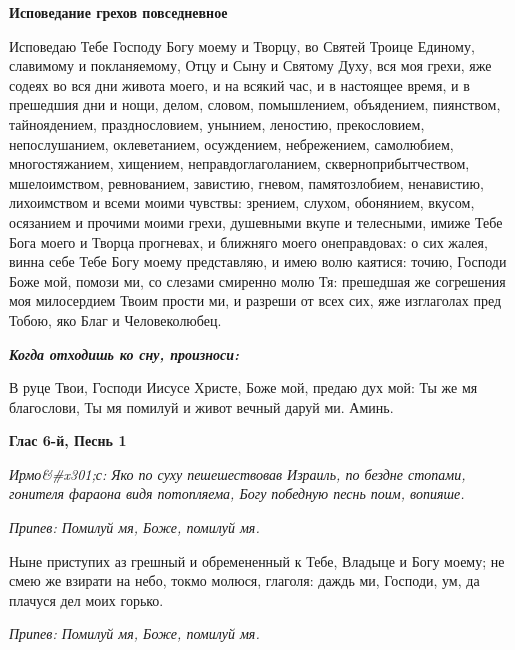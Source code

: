  

\bfseries Исповедание грехов повседневное\normalfont{}


   Исповедаю Тебе Господу Богу моему и Творцу, во Святей Троице
Единому, славимому и покланяемому, Отцу и Сыну и Святому Духу, вся
моя грехи, яже содеях во вся дни живота моего, и на всякий час,
и в настоящее время, и в прешедшия дни и нощи, делом, словом,
помышлением, объядением, пиянством, тайноядением, празднословием,
унынием, леностию, прекословием, непослушанием, оклеветанием,
осуждением, небрежением, самолюбием, многостяжанием, хищением,
неправдоглаголанием, скверноприбытчеством, мшелоимством, ревнованием,
завистию, гневом, памятозлобием, ненавистию, лихоимством и всеми
моими чувствы: зрением, слухом, обонянием, вкусом, осязанием и
прочими моими грехи, душевными вкупе и телесными, имиже Тебе
Бога моего и Творца прогневах, и ближняго моего онеправдовах: о
сих жалея, винна себе Тебе Богу моему представляю, и имею волю
каятися: точию, Господи Боже мой, помози ми, со слезами смиренно
молю Тя: прешедшая же согрешения моя милосердием Твоим прости
ми, и разреши от всех сих, яже изглаголах пред Тобою, яко Благ и
Человеколюбец.



 

\bfseries \itshape  Когда отходишь ко сну, произноси:\normalfont{}\normalfont{}


   В руце Твои, Господи Иисусе Христе, Боже мой, предаю дух мой:
Ты же мя благослови, Ты мя помилуй и живот вечный даруй ми.
Аминь.

   

\mychapterending

 

\bfseries Глас 6-й, Песнь 1\normalfont{}


\itshape Ирмо&#x301;с:\normalfont{} Яко по суху пешешествовав Израиль, по бездне стопами, гонителя фараона видя потопляема, Богу победную песнь поим, вопияше.


\itshape Припев:\normalfont{} Помилуй мя, Боже, помилуй мя.


Ныне приступих аз грешный и обремененный к Тебе, Владыце и Богу моему; не смею же взирати на небо, токмо молюся, глаголя: даждь ми, Господи, ум, да плачуся дел моих горько.


\itshape Припев:\normalfont{} Помилуй мя, Боже, помилуй мя.


